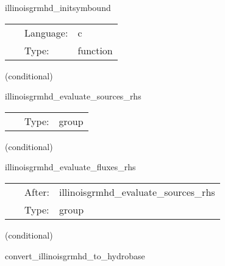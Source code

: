 \documentclass{article}
\begin{document}
\hspace{5mm} illinoisgrmhd\_initsymbound 

\hspace{5mm}{\it schedule symmetries } 


\hspace{5mm}

 \begin{tabular*}{160mm}{cll} 
~ & Language:  & c \\ 
~ & Type:  & function \\ 
\end{tabular*} 


\vspace{5mm}

   (conditional) 

\hspace{5mm} illinoisgrmhd\_evaluate\_sources\_rhs 

\hspace{5mm}{\it evaluate source terms in grmhd rhss } 


\hspace{5mm}

 \begin{tabular*}{160mm}{cll} 
~ & Type:  & group \\ 
\end{tabular*} 


\vspace{5mm}

   (conditional) 

\hspace{5mm} illinoisgrmhd\_evaluate\_fluxes\_rhs 

\hspace{5mm}{\it evaluate flux terms in grmhd rhss } 


\hspace{5mm}

 \begin{tabular*}{160mm}{cll} 
~ & After:  & illinoisgrmhd\_evaluate\_sources\_rhs \\ 
~ & Type:  & group \\ 
\end{tabular*} 


\vspace{5mm}

   (conditional) 

\hspace{5mm} convert\_illinoisgrmhd\_to\_hydrobase 
\end{document}
